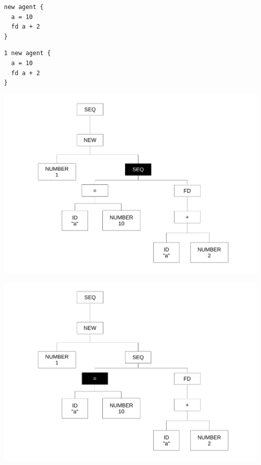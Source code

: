 \begin{frame}[fragile]
	\begin{lstlisting}[language=Stibbons]
new agent {
  a = 10
  fd a + 2
}
	\end{lstlisting}
	\begin{lstlisting}[language=Stibbons]
1 new agent {
  a = 10
  fd a + 2
}
	\end{lstlisting}
\end{frame}

\begin{frame}
\includegraphics[scale=0.3]{doc/Presentation/img/arbre4.pdf}
\end{frame}

\begin{frame}
\includegraphics[scale=0.3]{doc/Presentation/img/arbre5.pdf}
\end{frame}

